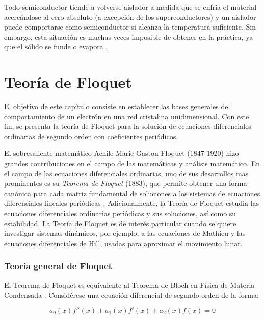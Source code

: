 Todo semiconductor tiende a volverse aislador a medida que se enfría el material acercándose al cero absoluto (a excepción de los superconductores) y un aislador puede comportarse como semiconductor si alcanza la temperatura suficiente. Sin embargo, esta situación es muchas veces imposible de obtener en la práctica, ya que el sólido se funde o evapora \cite{solidos}.




\section{Teoría de Floquet}\label{cap:2}

El objetivo de este capítulo consiste en establecer las bases generales del comportamiento de un electrón en una red cristalina unidimensional. Con este fin, se presenta la teoría de Floquet para la solución de ecuaciones diferenciales ordinarias de segundo orden con coeficientes periódicos.

El sobresaliente matemático Achile Marie Gaston Floquet (1847-1920) hizo grandes contribuciones en el campo de las matemáticas y análisis matemático.
En el campo de las ecuaciones diferenciales ordinarias, uno de sus desarrollos mas prominentes es su {\it{Teorema de Floquet}} (1883), que permite obtener una forma canónica para cada matriz fundamental de soluciones a los sistemas de ecuaciones diferenciales lineales periódicas \cite{mananga}. Adicionalmente, la Teoría de Floquet estudia las ecuaciones diferenciales ordinarias periódicas y sus soluciones, así como su estabilidad. 
La Teoría de Floquet es de interés particular cuando se quiere investigar sistemas dinámicos, por ejemplo, a las ecuaciones de Mathieu y las ecuaciones diferenciales de Hill, usadas para aproximar el movimiento lunar.

\subsubsection{Teoría general de Floquet}

El Teorema de Floquet es equivalente al Teorema de Bloch en Física de Materia Condensada \cite{mananga}. Considérese una ecuación diferencial de segundo orden de la forma:

\begin{equation}\label{eq:2.1}
    a_0(x)f''(x)+a_1(x)f'(x)+a_2(x)f(x)=0
\end{equation}


